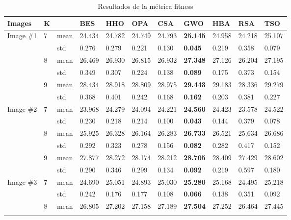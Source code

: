 \documentclass[conference]{IEEEtran}
\begin{document}
\begin{table*}
\caption{Resultados de la métrica fitness}
\centering
\begin{tabularx}{\textwidth}{|X|X|X|X|X|X|X|X|X|X|X|}
\hline
Images & K & & BES & HHO & OPA & CSA & GWO & HBA & RSA & TSO \\ \hline
\multirow{6}{*}{Image \#1} & \multirow{2}{*}{7} & mean &  24.434 & 24.782 & 24.749 & 24.793 & \textbf{25.145} & 24.958 & 24.218 & 25.107 \\ \cline{3-11} 
& & std & 0.276 & 0.279 & 0.221 & 0.130 & \textbf{0.045}  & 0.219 & 0.358 & 0.079\\ \cline{2-11} 
& \multirow{2}{*}{8} & mean & 26.469 & 26.930 & 26.815 & 26.932 & \textbf{27.348} & 27.126 & 26.204 & 27.195 \\ \cline{3-11} 
& & std & 0.349 & 0.307 & 0.224 & 0.138 & \textbf{0.089} & 0.175 & 0.373 & 0.154\\ \cline{2-11} 
& \multirow{2}{*}{9} & mean & 28.434 & 28.918 & 28.809 & 28.975 & \textbf{29.443} & 29.183 & 28.336 & 29.279\\ \cline{3-11} 
& & std &0.368 & 0.401 & 0.242 & 0.168 & \textbf{0.162} & 0.203 & 0.381 & 0.227\\ \hline
\multirow{6}{*}{Image \#2} & \multirow{2}{*}{7} & mean & 23.968 & 24.279 & 24.094 & 24.221 & \textbf{24.560} & 24.423 & 23.578 & 24.522 \\ \cline{3-11} 
& & std &0.230 & 0.218 & 0.214 & 0.100 & \textbf{0.043} & 0.144 & 0.379 & 0.078\\ \cline{2-11} 
& \multirow{2}{*}{8} & mean & 25.925 & 26.328 & 26.164 & 26.283 & \textbf{26.733} & 26.521 & 25.634 & 26.686 \\ \cline{3-11} 
& & std & 0.292 & 0.323 & 0.278 & 0.156 & \textbf{0.082} & 0.282 & 0.417 & 0.152\\ \cline{2-11} 
& \multirow{2}{*}{9} & mean & 27.877 & 28.272 & 28.174 & 28.212 & \textbf{28.705} & 28.409 & 27.429 & 28.602\\ \cline{3-11} 
& & std & 0.290 & 0.346 & 0.299 & 0.134 & \textbf{0.092} & 0.219 & 0.597 & 0.180 \\ \hline
\multirow{6}{*}{Image \#3} & \multirow{2}{*}{7} & mean & 24.690 & 25.051 & 24.893 & 25.030 & \textbf{25.280} & 25.168 & 24.495 & 25.218 \\ \cline{3-11} 
& & std &0.242 & 0.176 & 0.177 & 0.108 & \textbf{0.066} & 0.138 & 0.351 & 0.092\\ \cline{2-11} 
& \multirow{2}{*}{8} & mean & 26.805 & 27.202 & 27.158 & 27.189 & \textbf{27.504} & 27.252 & 26.464 & 27.445\\ \cline{3-11} 

\end{tabularx}
\end{table*}
\end{document}
